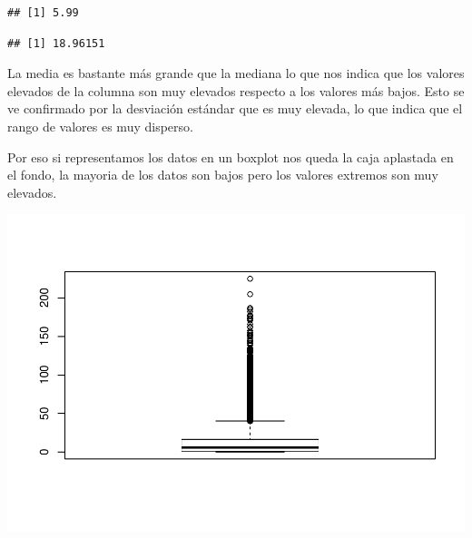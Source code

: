 \documentclass[]{article}
\newenvironment{Shaded}{\begin{snugshade}}{\end{snugshade}}
\newcommand{\KeywordTok}[1]{\textcolor[rgb]{0.13,0.29,0.53}{\textbf{#1}}}
\newcommand{\NormalTok}[1]{#1}
\newcommand{\OperatorTok}[1]{\textcolor[rgb]{0.81,0.36,0.00}{\textbf{#1}}}
\begin{document}
\begin{Shaded}
\end{Shaded}

\begin{verbatim}
## [1] 5.99
\end{verbatim}

\begin{Shaded}
\end{Shaded}

\begin{verbatim}
## [1] 18.96151
\end{verbatim}

La media es bastante más grande que la mediana lo que nos indica que los
valores elevados de la columna son muy elevados respecto a los valores
más bajos. Esto se ve confirmado por la desviación estándar que es muy
elevada, lo que indica que el rango de valores es muy disperso.

Por eso si representamos los datos en un boxplot nos queda la caja
aplastada en el fondo, la mayoria de los datos son bajos pero los
valores extremos son muy elevados.

\begin{Shaded}
\end{Shaded}

\includegraphics{Informe_files/figure-latex/unnamed-chunk-19-1.pdf}
\end{document}
